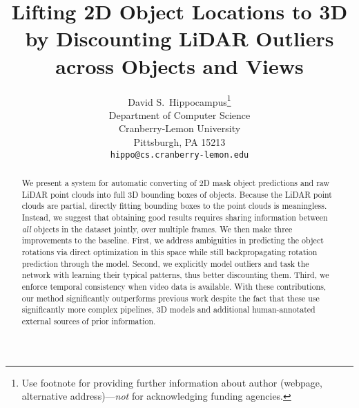 \documentclass[]{article}
\title{Lifting 2D Object Locations to 3D by Discounting LiDAR Outliers across Objects and Views}
\author{%
  David S.~Hippocampus\thanks{Use footnote for providing further information
    about author (webpage, alternative address)---\emph{not} for acknowledging
    funding agencies.} \\
  Department of Computer Science\\
  Cranberry-Lemon University\\
  Pittsburgh, PA 15213 \\
  \texttt{hippo@cs.cranberry-lemon.edu} \\
}
\begin{document}
\maketitle

\begin{abstract}
We present a system for automatic converting of 2D mask object predictions and raw LiDAR point clouds into full 3D bounding boxes of objects.
Because the LiDAR point clouds are partial, directly fitting bounding boxes to the point clouds is meaningless.
Instead, we suggest that obtaining good results requires sharing information between \emph{all} objects in the dataset jointly, over multiple frames.
We then make three improvements to the baseline.
First, we address ambiguities in predicting the object rotations via direct optimization in this space while still backpropagating rotation prediction through the model.
Second, we explicitly model outliers and task the network with learning their typical patterns, thus better discounting them.
Third, we enforce temporal consistency when video data is available.
With these contributions, our method significantly outperforms previous work despite the fact that these use significantly more complex pipelines, 3D models and additional human-annotated external sources of prior information.
\end{abstract}
\end{document}

